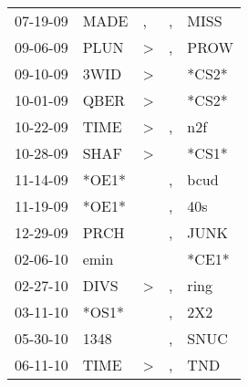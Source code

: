 \begin{supertabular}{p{0.07\textwidth}p{0.06\textwidth}p{0.02\textwidth}p{0.02\textwidth}p{0.06\textwidth}}
          07-19-09\textsuperscript{} &           MADE\textsuperscript{} &                , &                , &           MISS\textsuperscript{} \\
          09-06-09\textsuperscript{} &           PLUN\textsuperscript{} &     \textgreater &                , &           PROW\textsuperscript{} \\
          09-10-09\textsuperscript{} &           3WID\textsuperscript{} &     \textgreater &                  &                            *CS2* \\
          10-01-09\textsuperscript{} &           QBER\textsuperscript{} &     \textgreater &                  &                            *CS2* \\
          10-22-09\textsuperscript{} &           TIME\textsuperscript{} &     \textgreater &                , &            n2f\textsuperscript{} \\
          10-28-09\textsuperscript{} &           SHAF\textsuperscript{} &     \textgreater &                  &                            *CS1* \\
          11-14-09\textsuperscript{} &                            *OE1* &                  &                , &           bcud\textsuperscript{} \\
          11-19-09\textsuperscript{} &                            *OE1* &                  &                , &            40s\textsuperscript{} \\
          12-29-09\textsuperscript{} &           PRCH\textsuperscript{} &                  &                , &           JUNK\textsuperscript{} \\
          02-06-10\textsuperscript{} &           emin\textsuperscript{} &                  &                  &                            *CE1* \\
          02-27-10\textsuperscript{} &           DIVS\textsuperscript{} &     \textgreater &                , &           ring\textsuperscript{} \\
          03-11-10\textsuperscript{} &                            *OS1* &                  &                , &            2X2\textsuperscript{} \\
          05-30-10\textsuperscript{} &           1348\textsuperscript{} &                  &                , &           SNUC\textsuperscript{} \\
          06-11-10\textsuperscript{} &           TIME\textsuperscript{} &     \textgreater &                , &            TND\textsuperscript{} \\

\end{supertabular}
